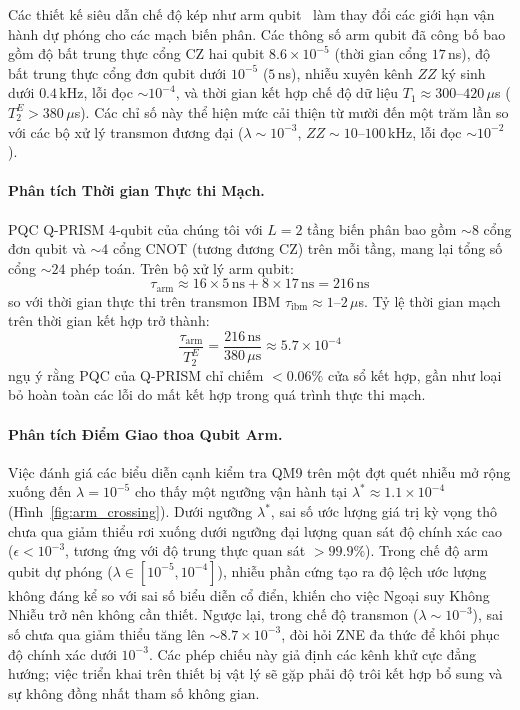 \documentclass[10pt,twocolumn,letterpaper]{article}
\begin{document}
Các thiết kế siêu dẫn chế độ kép như arm qubit~\cite{Kline:2025ecg} làm thay đổi các giới hạn vận hành dự phóng cho các mạch biến phân. Các thông số arm qubit đã công bố bao gồm độ bất trung thực cổng CZ hai qubit $8.6 \times 10^{-5}$ (thời gian cổng $17$\,ns), độ bất trung thực cổng đơn qubit dưới $10^{-5}$ ($5$\,ns), nhiễu xuyên kênh $ZZ$ ký sinh dưới $0.4$\,kHz, lỗi đọc $\sim 10^{-4}$, và thời gian kết hợp chế độ dữ liệu $T_1 \approx 300$--$420\,\mu$s ($T_2^E > 380\,\mu$s). Các chỉ số này thể hiện mức cải thiện từ mười đến một trăm lần so với các bộ xử lý transmon đương đại ($\lambda \sim 10^{-3}$, $ZZ \sim 10$--$100$\,kHz, lỗi đọc $\sim 10^{-2}$).

\paragraph{Phân tích Thời gian Thực thi Mạch.}
PQC Q-PRISM 4-qubit của chúng tôi với $L = 2$ tầng biến phân bao gồm $\sim 8$ cổng đơn qubit và $\sim 4$ cổng CNOT (tương đương CZ) trên mỗi tầng, mang lại tổng số cổng $\sim 24$ phép toán. Trên bộ xử lý arm qubit:
\begin{equation}
    \tau_{\mathrm{arm}} \approx 16 \times 5\,\mathrm{ns} + 8 \times 17\,\mathrm{ns} = 216\,\mathrm{ns}
\end{equation}
so với thời gian thực thi trên transmon IBM $\tau_{\mathrm{ibm}} \approx 1$--$2\,\mu$s. Tỷ lệ thời gian mạch trên thời gian kết hợp trở thành:
\begin{equation}
    \frac{\tau_{\mathrm{arm}}}{T_2^E} = \frac{216\,\mathrm{ns}}{380\,\mu\mathrm{s}} \approx 5.7 \times 10^{-4}
\end{equation}
ngụ ý rằng PQC của Q-PRISM chỉ chiếm $< 0.06\%$ cửa sổ kết hợp, gần như loại bỏ hoàn toàn các lỗi do mất kết hợp trong quá trình thực thi mạch.

\paragraph{Phân tích Điểm Giao thoa Qubit Arm.}
Việc đánh giá các biểu diễn cạnh kiểm tra QM9 trên một đợt quét nhiễu mở rộng xuống đến $\lambda = 10^{-5}$ cho thấy một ngưỡng vận hành tại $\lambda^* \approx 1.1 \times 10^{-4}$ (Hình~\ref{fig:arm_crossing}). Dưới ngưỡng $\lambda^*$, sai số ước lượng giá trị kỳ vọng thô chưa qua giảm thiểu rơi xuống dưới ngưỡng đại lượng quan sát độ chính xác cao ($\epsilon < 10^{-3}$, tương ứng với độ trung thực quan sát $> 99.9\%$). Trong chế độ arm qubit dự phóng ($\lambda \in [10^{-5}, 10^{-4}]$), nhiễu phần cứng tạo ra độ lệch ước lượng không đáng kể so với sai số biểu diễn cổ điển, khiến cho việc Ngoại suy Không Nhiễu trở nên không cần thiết. Ngược lại, trong chế độ transmon ($\lambda \sim 10^{-3}$), sai số chưa qua giảm thiểu tăng lên $\sim 8.7 \times 10^{-3}$, đòi hỏi ZNE đa thức để khôi phục độ chính xác dưới $10^{-3}$. Các phép chiếu này giả định các kênh khử cực đẳng hướng; việc triển khai trên thiết bị vật lý sẽ gặp phải độ trôi kết hợp bổ sung và sự không đồng nhất tham số không gian.
\end{document}
